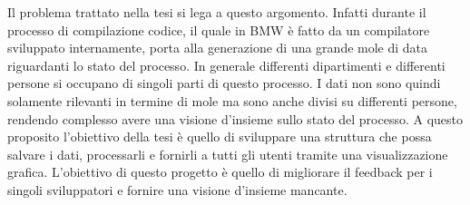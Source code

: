 \documentclass[../main.tex]{subfiles}
\begin{document}
Il problema trattato nella tesi si lega a questo argomento. Infatti durante il processo di compilazione codice, il quale in \gls{BMW} è fatto da un compilatore sviluppato internamente, porta alla generazione di una grande mole di data riguardanti lo stato del processo. In generale differenti dipartimenti e differenti persone si occupano di singoli parti di questo processo. I dati non sono quindi solamente rilevanti in termine di mole ma sono anche divisi su differenti persone, rendendo complesso avere una visione d'insieme sullo stato del processo. A questo proposito l'obiettivo della tesi è quello di sviluppare una struttura che possa salvare i dati, processarli e fornirli a tutti gli utenti tramite una visualizzazione grafica. L'obiettivo di questo progetto è quello di migliorare il feedback per i singoli sviluppatori e fornire una visione d'insieme mancante. 
\end{document}
